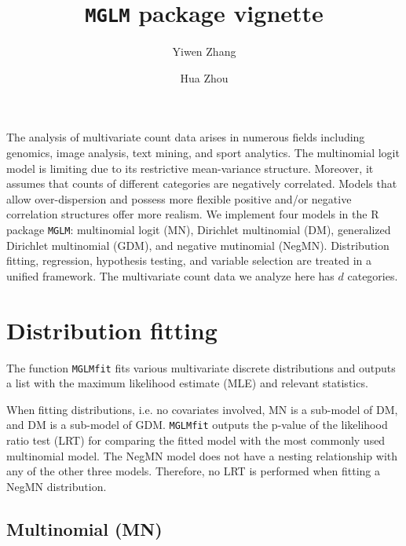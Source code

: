 \documentclass[a4paper]{article}
\title{{\tt MGLM} package vignette}
\author{Yiwen Zhang \and Hua Zhou}
\begin{document}


\maketitle


The analysis of multivariate count data arises in numerous fields including genomics, image analysis, text mining, and sport analytics.  The multinomial logit model is limiting due to its restrictive mean-variance structure. Moreover, it assumes that counts of different categories are negatively correlated.  Models that allow over-dispersion and possess more flexible positive and/or negative correlation structures offer more realism.  We implement four models in the R package {\tt MGLM}: multinomial logit (MN), Dirichlet multinomial (DM), generalized Dirichlet multinomial (GDM), and negative mutinomial (NegMN). Distribution fitting, regression, hypothesis testing, and variable selection are treated in a unified framework. The multivariate count data we analyze here has $d$ categories.

\section{Distribution fitting}

The function {\tt MGLMfit} fits various multivariate discrete distributions and outputs a list with the maximum likelihood estimate (MLE) and relevant statistics.  

When fitting distributions, i.e. no covariates involved, MN is a sub-model of DM, and DM is a sub-model of GDM. %
{\tt MGLMfit} outputs the p-value of the likelihood ratio test (LRT) for comparing the fitted model with the most commonly used multinomial model.  The NegMN model does not have a nesting relationship with any of the other three models. Therefore, no LRT is performed when fitting a NegMN distribution.

\subsection{Multinomial (MN)}
\end{document}
